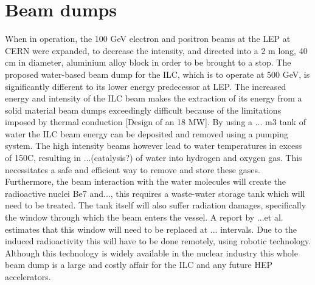 \section{Beam dumps}\vspace{-8pt}

When in operation, the 100 GeV electron and positron beams at the LEP at CERN were expanded, to decrease the intensity, and directed into a 2 m long, 40 cm in diameter, aluminium alloy block in order to be brought to a stop. The proposed water-based beam dump for the ILC, which is to operate at 500 GeV, is significantly different to its lower energy predecessor at LEP. The increased energy and intensity of the ILC beam makes the extraction of its energy from a solid material beam dumps exceedingly difficult because of the limitations imposed by thermal conduction [Design of an 18 MW]. By using a ... m3 tank of water the ILC beam energy can be deposited and removed using a pumping system. The high intensity beams however lead to water temperatures in excess of 150\degree C, resulting in ...(catalysis?) of water into hydrogen and oxygen gas. This necessitates a safe and efficient way to remove and store these gases. Furthermore, the beam interaction with the water molecules will create the radioactive nuclei Be7 and..., this requires a waste-water storage tank which will need to be treated. The tank itself will also suffer radiation damages, specifically the window through which the beam enters the vessel. A report by ...et al. estimates that this window will need to be replaced at ... intervals. Due to the induced radioactivity this will have to be done remotely, using robotic technology. Although this technology is widely available in the nuclear industry this whole beam dump is a large and costly affair for the ILC and any future HEP accelerators. \\
